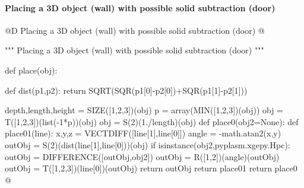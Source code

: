 \documentclass[11pt,oneside]{article}    %
\begin{document}
\paragraph{Placing a 3D object (wall) with possible solid subtraction (door)}
@D Placing a 3D object (wall) with possible solid subtraction (door)
@{""" Placing a 3D object (wall) with possible solid subtraction (door) """

def place(obj):

    def dist(p1,p2):
        return SQRT(SQR(p1[0]-p2[0])+SQR(p1[1]-p2[1]))

    depth,length,height = SIZE([1,2,3])(obj)
    p = array(MIN([1,2,3])(obj))
    obj = T([1,2,3])(list(-1*p))(obj)
    obj = S(2)(1./length)(obj)
    def place0(obj2=None):
        def place01(line):
            x,y,z = VECTDIFF([line[1],line[0]])
            angle = -math.atan2(x,y)
            outObj = S(2)(dist(line[1],line[0]))(obj)
            if isinstance(obj2,pyplasm.xgepy.Hpc):
                outObj = DIFFERENCE([outObj,obj2])
            outObj = R([1,2])(angle)(outObj)
            outObj = T([1,2,3])(line[0])(outObj)
            return outObj
        return place01
    return place0
@}
\end{document}
